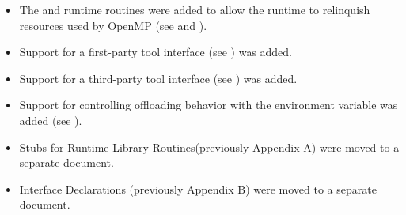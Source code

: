 \begin{itemize}
\item The  and  
      runtime routines were added to allow the runtime to relinquish 
      resources used by OpenMP (see 
      and ).

\item Support for a first-party tool interface (see
      ) was added.

\item Support for a third-party tool interface (see
      ) was added.

\item Support for controlling offloading behavior with the
       environment variable was added
      (see  ).      
      
\item Stubs for Runtime Library Routines(previously Appendix A) 
      were moved to a separate document.
      
\item Interface Declarations (previously Appendix B) were moved 
      to a separate document.
\end{itemize}



